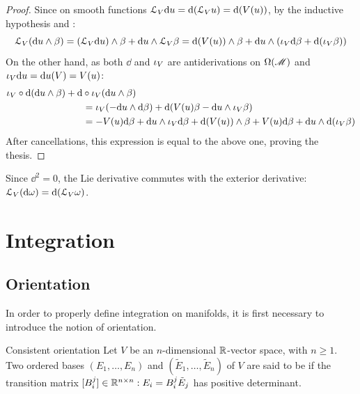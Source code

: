 \begin{proofbox}
\begin{proof}
    Since on smooth functions $ \EuScript{L}_V \mathrm{d} u = \mathrm{d} (\EuScript{L}_V u) = \mathrm{d} (V(u)) $, by the inductive hypothesis and :
    \begin{equation*}
      \EuScript{L}_V (\mathrm{d} u \wedge \beta) = (\EuScript{L}_V \mathrm{d} u) \wedge \beta + \mathrm{d} u \wedge \EuScript{L}_V \beta = \mathrm{d} (V(u)) \wedge \beta + \mathrm{d} u \wedge (\iota_V \mathrm{d} \beta + \mathrm{d} (\iota_V \beta))
    \end{equation*}
    On the other hand, as both $ \dd $ and $ \iota_V $ are antiderivations on $ \Omega(\mathscr{M}) $ and $ \iota_V \mathrm{d} u = \mathrm{d} u(V) = V(u) $:
    \begin{equation*}
      \begin{split}
        & \iota_V \circ \mathrm{d} (\mathrm{d} u \wedge \beta) + \mathrm{d} \circ \iota_V (\mathrm{d} u \wedge \beta) \\
        & \qquad \qquad \qquad \qquad = \iota_V (- \mathrm{d} u \wedge \mathrm{d} \beta) + \mathrm{d} (V(u) \beta - \mathrm{d} u \wedge \iota_V \beta) \\
        & \qquad \qquad \qquad \qquad = - V(u) \mathrm{d} \beta + \mathrm{d} u \wedge \iota_V \mathrm{d} \beta + \mathrm{d} (V(u)) \wedge \beta + V(u) \mathrm{d} \beta + \mathrm{d} u \wedge \mathrm{d} (\iota_V \beta)
      \end{split}
    \end{equation*}
    After cancellations, this expression is equal to the above one, proving the thesis.
  \end{proof}
\end{proofbox}

Since $ \dd^2 = 0 $, the Lie derivative commutes with the exterior derivative: $ \EuScript{L}_V (\mathrm{d} \omega) = \mathrm{d} (\EuScript{L}_V \omega) $.

\section{Integration}
\label{sec:integration}

\subsection{Orientation}

In order to properly define integration on manifolds, it is first necessary to introduce the notion of orientation.

\begin{definition}{Consistent orientation}{}
  Let $ V $ be an $ n $-dimensional $ \mathbb{R} $-vector space, with $ n \geq 1 $. Two ordered bases $ (E_1 , \dots , E_n) $ and $ (\tilde{E}_1 , \dots , \tilde{E}_n) $ of $ V $ are said to be  if the transition matrix $ [B_i^j] \in \mathbb{R}^{n \times n} : E_i = B_i^j \tilde{E}_j $ has positive determinant.
\end{definition}

